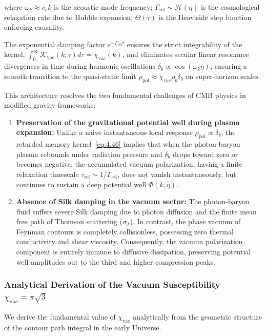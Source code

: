 \documentclass[11pt,a4paper]{article}
\theoremstyle{definition}
\begin{document}
where $\omega_k \approx c_s k$ is the acoustic mode frequency;  
$\Gamma_{\text{rel}} \sim \mathcal{H}(\eta)$ is the cosmological relaxation rate due to Hubble expansion;  
$\Theta(\tau)$ is the Heaviside step function enforcing causality.

The exponential damping factor $e^{-\Gamma_{\text{rel}} \tau}$ ensures the strict integrability of the kernel, $\int_0^\infty \mathcal{K}_{\text{vac}}(k, \tau) d\tau = \chi_{\text{vac}}(k)$, and eliminates secular linear resonance divergences in time during harmonic oscillations $\delta_b \propto \cos(\omega_k \eta)$, ensuring a smooth transition to the quasi-static limit $\rho_{\text{pol}} \approx \chi_{\text{vac}} \rho_b \delta_b$ on super-horizon scales.

This architecture resolves the two fundamental challenges of CMB physics in modified gravity frameworks:
\begin{enumerate}
\item \textbf{Preservation of the gravitational potential well during plasma expansion:} Unlike a naive instantaneous local response $\rho_{\text{pol}} \propto \delta_b$, the retarded memory kernel~\eqref{eq:4.46} implies that when the photon-baryon plasma rebounds under radiation pressure and $\delta_b$ drops toward zero or becomes negative, the accumulated vacuum polarization, having a finite relaxation timescale $\tau_{\text{rel}} \sim 1/\Gamma_{\text{rel}}$, does not vanish instantaneously, but continues to sustain a deep potential well $\Phi(k, \eta)$.
\item \textbf{Absence of Silk damping in the vacuum sector:} The photon-baryon fluid suffers severe Silk damping due to photon diffusion and the finite mean free path of Thomson scattering ($\sigma_T$). In contrast, the phase vacuum of Feynman contours is completely collisionless, possessing zero thermal conductivity and shear viscosity. Consequently, the vacuum polarization component is entirely immune to diffusive dissipation, preserving potential well amplitudes out to the third and higher compression peaks.
\end{enumerate}


\subsubsection{Analytical Derivation of the Vacuum Susceptibility $\chi_{\text{vac}} = \pi\sqrt{3}$}

We derive the fundamental value of $\chi_{\text{vac}}$ analytically from the geometric structure of the contour path integral in the early Universe.
\end{document}
